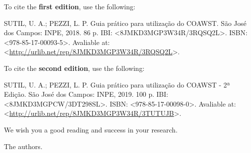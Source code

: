 \noindent To cite the \textbf{first edition}, use the following:
\bigskip

\noindent SUTIL, U. A.; PEZZI, L. P. Guia prático para utilização do COAWST. São José dos Campos: INPE, 2018. 86 p. IBI: <8JMKD3MGP3W34R/3RQSQ2L>. ISBN: <978-85-17-00093-5>. Avaliable at: <\textcolor{bleu_cite}{\href{http://urlib.net/rep/8JMKD3MGP3W34R/3RQSQ2L}{http://urlib.net/rep/8JMKD3MGP3W34R/3RQSQ2L}}>. 
\bigskip

\noindent To cite the \textbf{second edition}, use the following:
\bigskip

\noindent SUTIL, U. A.; PEZZI, L. P. Guia prático para utilização do COAWST - 2ª Edição. São José dos Campos: INPE, 2019. 100 p. IBI: <8JMKD3MGPCW/3DT298SL>. ISBN: <978-85-17-00098-0>. Avaliable at: <\textcolor{bleu_cite}{\href{http://urlib.net/rep/8JMKD3MGP3W34R/3TUTUJB}{http://urlib.net/rep/8JMKD3MGP3W34R/3TUTUJB}}>. 

\bigskip
\bigskip

\noindent We wish you a good reading and success in your research.
\begin{flushright}
\noindent The authors.
\end{flushright}
\bigskip
